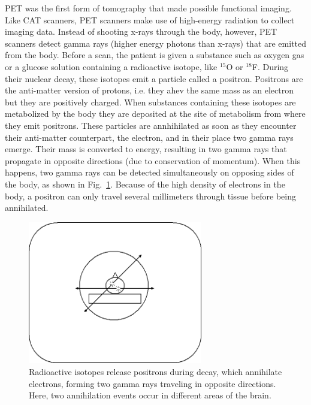 PET was the first form of tomography that made possible functional imaging.  Like CAT scanners, PET scanners make use of high-energy radiation to collect imaging data.  Instead of shooting x-rays through the body, however, PET scanners detect gamma rays (higher energy photons than x-rays) that are emitted from the body. Before a scan, the patient is given a substance such as oxygen gas or a glucose solution containing a radioactive isotope, like $^{15}$O or $^{18}$F. During their nuclear decay, these isotopes emit a particle called a positron. Positrons are the anti-matter version of protons, i.e. they ahev the same mass as an electron but they are positively charged. When substances containing these isotopes are metabolized by the body they are deposited at the site of metabolism from where they emit positrons. These particles are annhihilated as soon as they encounter their anti-matter counterpart, the electron, and in their place two gamma rays emerge. Their mass is converted to energy, resulting in two gamma rays that propagate in opposite directions (due to conservation of momentum). When this happens, two gamma rays can be detected simultaneously on opposing sides of the body, as shown in Fig.~\ref{Fig10-12}.  Because of the high density of electrons in the body, a positron can only travel several millimeters through tissue before being annihilated. 
\begin{figure}[!htb]
	\centering
	\includegraphics[width=3.0in]{./figures/Topic10/Fig10-12.png}
	\caption{Radioactive isotopes release positrons during decay, which annihilate electrons, forming two gamma rays traveling in opposite directions.  Here, two annihilation events occur in different areas of the brain.}
	\label{Fig10-12}
\end{figure}


